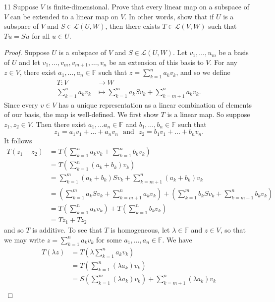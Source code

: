 \documentclass{extarticle}
\newenvironment{problem}[1]{\begin{prob*}{#1}{}}{\end{prob*}}
\newcommand{\F}{\mathbb{F}}
\newcommand{\Hom}{\mathcal{L}}
\begin{document}
\begin{problem}{11}
Suppose $V$ is finite-dimensional.  Prove that every linear map on a subspace of $V$ can be extended to a linear map on $V$.  In other words, show that if $U$ is a subspace of $V$ and $S\in\Hom(U,W)$, then there exists $T\in\Hom(V,W)$ such that $Tu = Su$ for all $u\in U$.
\end{problem}
\begin{proof}
Suppose $U$ is a subspace of $V$ and $S\in\Hom(U,W)$.  Let $v_1,\dots, u_m$ be a basis of $U$ and let $v_1,\dots, v_m, v_{m+1},\dots, v_n$ be an extension of this basis to $V$.  For any $z\in V$, there exist $a_1,\dots, a_n\in\F$ such that $z =\sum_{k=1}^na_kv_k$, and so we define 
\begin{align*}
T: V &\to W\\
    \sum_{k = 1}^n a_kv_k &\mapsto \sum_{k = 1}^m a_kSv_k + \sum_{k = m+1}^n a_kv_k.
\end{align*}
Since every $v\in V$ has a unique representation as a linear combination of elements of our basis, the map is well-defined.  We first show $T$ is a linear map.  So suppose $z_1,z_2\in V$.  Then there exist $a_1,\dots a_n\in \F$ and $b_1,\dots, b_n\in\F$ such that 
\begin{equation*}
z_1 = a_1v_1 + \dots + a_nv_n ~~~\text{and}~~~ z_2 = b_1v_1 + \dots + b_nv_n.
\end{equation*}
It follows
\begin{align*}
T(z_1 + z_2) &= T\left(\sum_{k=1}^na_kv_k + \sum_{k=1}^nb_kv_k\right)\\
&= T\left(\sum_{k=1}^n(a_k + b_k)v_k\right)\\
&= \sum_{k=1}^m(a_k + b_k)Sv_k + \sum_{k=m+1}^n(a_k + b_k)v_k\\
&= \left(\sum_{k=1}^ma_kSv_k + \sum_{k=m+1}^na_kv_k\right) + \left(\sum_{k=1}^mb_kSv_k + \sum_{k=m+1}^nb_kv_k\right)\\
&= T\left(\sum_{k=1}^na_kv_k\right) + T\left(\sum_{k=1}^nb_kv_k \right)\\
&= Tz_1 + Tz_2
\end{align*}
and so $T$ is additive.  To see that $T$ is homogeneous, let $\lambda \in\F$ and $z\in V$, so that we may write $z =\sum_{k=1}^na_kv_k$ for some $a_1,\dots,a_n\in\F$. We have
\begin{align*}
T(\lambda z) &= T\left(\lambda \sum_{k=1}^na_kv_k\right)\\
&= T\left(\sum_{k=1}^n(\lambda a_k)v_k\right)\\
&= S\left(\sum_{k=1}^m(\lambda a_k)v_k\right) + \sum_{k=m+1}^n(\lambda a_k)v_k\\

\end{align*}
\end{proof}
\end{document}
